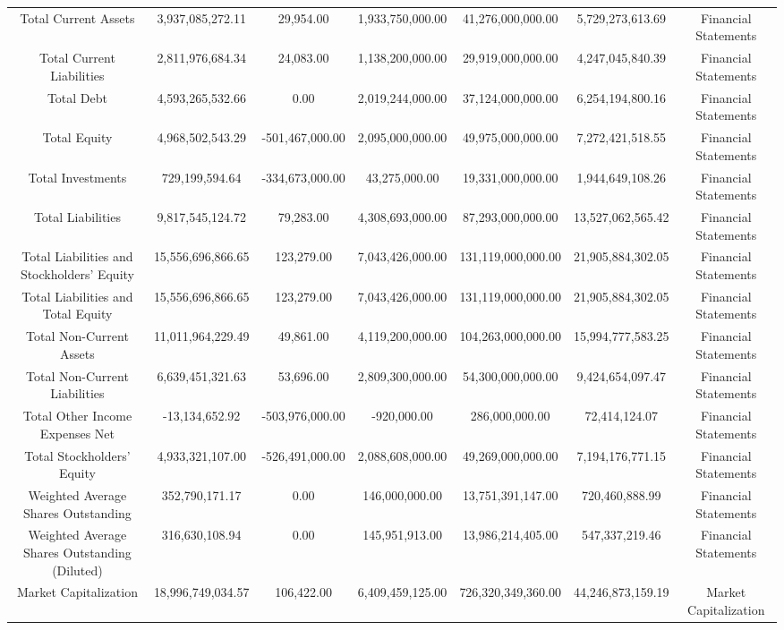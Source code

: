 \begin{longtable}{ccccccc}
Total Current Assets & 3,937,085,272.11 & 29,954.00 & 1,933,750,000.00 & 41,276,000,000.00 & 5,729,273,613.69 & Financial Statements \\
Total Current Liabilities & 2,811,976,684.34 & 24,083.00 & 1,138,200,000.00 & 29,919,000,000.00 & 4,247,045,840.39 & Financial Statements \\
Total Debt & 4,593,265,532.66 & 0.00 & 2,019,244,000.00 & 37,124,000,000.00 & 6,254,194,800.16 & Financial Statements \\
Total Equity & 4,968,502,543.29 & -501,467,000.00 & 2,095,000,000.00 & 49,975,000,000.00 & 7,272,421,518.55 & Financial Statements \\
Total Investments & 729,199,594.64 & -334,673,000.00 & 43,275,000.00 & 19,331,000,000.00 & 1,944,649,108.26 & Financial Statements \\
Total Liabilities & 9,817,545,124.72 & 79,283.00 & 4,308,693,000.00 & 87,293,000,000.00 & 13,527,062,565.42 & Financial Statements \\
Total Liabilities and Stockholders' Equity & 15,556,696,866.65 & 123,279.00 & 7,043,426,000.00 & 131,119,000,000.00 & 21,905,884,302.05 & Financial Statements \\
Total Liabilities and Total Equity & 15,556,696,866.65 & 123,279.00 & 7,043,426,000.00 & 131,119,000,000.00 & 21,905,884,302.05 & Financial Statements \\
Total Non-Current Assets & 11,011,964,229.49 & 49,861.00 & 4,119,200,000.00 & 104,263,000,000.00 & 15,994,777,583.25 & Financial Statements \\
Total Non-Current Liabilities & 6,639,451,321.63 & 53,696.00 & 2,809,300,000.00 & 54,300,000,000.00 & 9,424,654,097.47 & Financial Statements \\
Total Other Income Expenses Net & -13,134,652.92 & -503,976,000.00 & -920,000.00 & 286,000,000.00 & 72,414,124.07 & Financial Statements \\
Total Stockholders' Equity & 4,933,321,107.00 & -526,491,000.00 & 2,088,608,000.00 & 49,269,000,000.00 & 7,194,176,771.15 & Financial Statements \\
Weighted Average Shares Outstanding & 352,790,171.17 & 0.00 & 146,000,000.00 & 13,751,391,147.00 & 720,460,888.99 & Financial Statements \\
Weighted Average Shares Outstanding (Diluted) & 316,630,108.94 & 0.00 & 145,951,913.00 & 13,986,214,405.00 & 547,337,219.46 & Financial Statements \\
Market Capitalization & 18,996,749,034.57 & 106,422.00 & 6,409,459,125.00 & 726,320,349,360.00 & 44,246,873,159.19 & Market Capitalization \\
\end{longtable}

\normalsize
